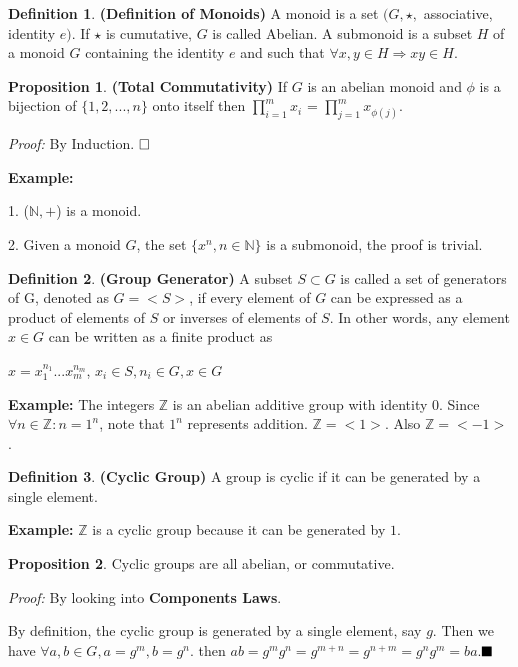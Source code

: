 \documentclass{article}
\theoremstyle{definition}
\newtheorem{defi}{Definition}[subsection]
\newtheorem{prop}{Proposition}[subsection]
\begin{document}
\begin{defi}
\textbf{(Definition of Monoids)} A monoid is a set $(G, \star,$ associative, identity $e)$. If $\star$ is cumutative, $G$ is called Abelian. A submonoid is a subset $H$ of a monoid $G$ containing the identity $e$ and such that $\forall x, y \in H \Rightarrow xy \in H $.
\end{defi}

\begin{prop}
\textbf{(Total Commutativity)} If $G$ is an abelian monoid and $\phi$ is a bijection of $\{1,2,...,n\}$ onto itself then $\prod^{m}_{i=1}x_i$ = $\prod^{m}_{j=1}x_{\phi(j)}$.
\end{prop}
\textit{Proof:} By Induction. $\hfill \square$

\noindent\textbf{Example:}

1. ($\mathbb{N},+$) is a monoid.

2. Given a monoid $G$, the set ${\{x^{n}, n \in \mathbb{N} \}}$ is a submonoid, the proof is trivial.
\begin{defi}
\noindent\textbf{(Group Generator)} A subset $S \subset G$ is called a set of generators of G, denoted as $G=<S>$, if every element of $G$ can be expressed as a product of elements of $S$ or inverses of elements of $S$. In other words, any element $x \in G$ can be written as a finite product as 

$x = x_{1}^{n_{1}}...x_{m}^{n_{m}}$, $x_{i} \in S, n_{i} \in G, x \in G$

\noindent\textbf{Example:} The integers $\mathbb{Z}$ is an abelian additive group with identity 0. Since $\forall n \in \mathbb{Z}: n=1^{n}$, note that $1^{n}$ represents addition. $\mathbb{Z}=<1>$. Also $\mathbb{Z}=<-1>$.
\end{defi}
\begin{defi}
\noindent\textbf{(Cyclic Group)} A group is cyclic if it can be generated by a single element.

\noindent\textbf{Example:} $\mathbb{Z}$ is a cyclic group because it can be generated by $1$.
\end{defi}
\begin{prop}
Cyclic groups are all abelian, or commutative.
\end{prop}
\textit{Proof:} By looking into \textbf{Components Laws}. 

By definition, the cyclic group is generated by a single element, say $g$. Then we have $\forall a, b \in G, a=g^{m}, b=g^{n}$. then $ab = g^{m}g^{n} = g^{m+n} = g^{n+m} = g^ng^m = ba$.$\hfill \blacksquare$
\end{document}
